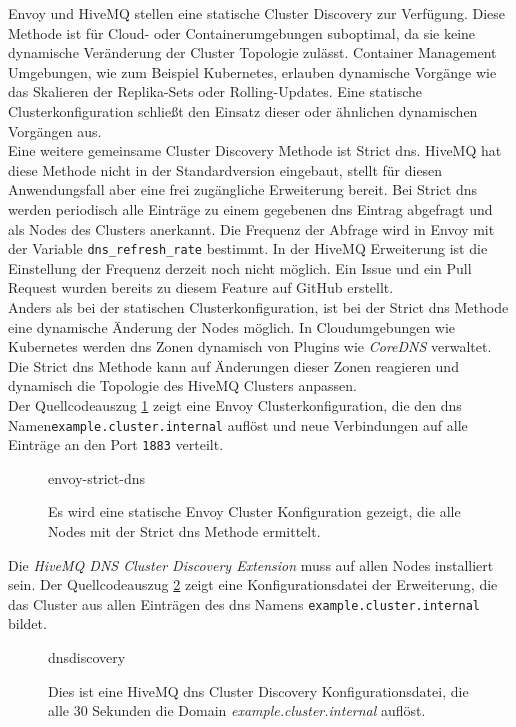 Envoy und HiveMQ stellen eine statische Cluster Discovery zur Verfügung. Diese Methode ist für Cloud- oder Containerumgebungen suboptimal, da sie keine dynamische Veränderung der Cluster Topologie zulässt. Container Management Umgebungen, wie zum Beispiel Kubernetes, erlauben dynamische Vorgänge wie das Skalieren der Replika-Sets oder Rolling-Updates. Eine statische Clusterkonfiguration schlie{\ss}t den Einsatz dieser oder ähnlichen dynamischen Vorgängen aus.\\
Eine weitere gemeinsame Cluster Discovery Methode ist Strict \ac{dns}. HiveMQ hat diese Methode nicht in der Standardversion eingebaut, stellt für diesen Anwendungsfall aber eine frei zugängliche Erweiterung bereit.
Bei Strict \ac{dns} werden periodisch alle Einträge zu einem gegebenen \ac{dns} Eintrag abgefragt und als Nodes des Clusters anerkannt. Die Frequenz der Abfrage wird in Envoy mit der Variable \verb|dns_refresh_rate| bestimmt. In der HiveMQ Erweiterung ist die Einstellung der Frequenz derzeit noch nicht möglich. Ein Issue \cite{AllowConfigurationDiscovery} und ein Pull Request \cite{ExponentialBackoffGeneral} wurden bereits zu diesem Feature auf GitHub erstellt.
\\
Anders als bei der statischen Clusterkonfiguration, ist bei der Strict \ac{dns} Methode eine dynamische Änderung der Nodes möglich. In Cloudumgebungen wie Kubernetes werden \ac{dns} Zonen dynamisch von Plugins wie \textit{CoreDNS} verwaltet.\cite{DNSServicesPods}
Die Strict \ac{dns} Methode kann auf Änderungen dieser Zonen reagieren und dynamisch die Topologie des HiveMQ Clusters anpassen.
\\
Der Quellcodeauszug \ref{code:envoy-strict-dns} zeigt eine Envoy Clusterkonfiguration, die den \ac{dns} Namen\newline \verb|example.cluster.internal| auflöst und neue Verbindungen auf alle Einträge an den Port \verb|1883| verteilt.
\begin{figure}
    {envoy-strict-dns}
    \caption{Es wird eine statische Envoy Cluster Konfiguration gezeigt, die alle Nodes mit der Strict \ac{dns} Methode ermittelt.}
    \label{code:envoy-strict-dns}
\end{figure}
Die \textit{HiveMQ DNS Cluster Discovery Extension} \cite{HiveMQExtensionDNS} muss auf allen Nodes installiert sein. Der Quellcodeauszug \ref{code:hivemq-dnsdiscovery} zeigt eine Konfigurationsdatei der Erweiterung, die das Cluster aus allen Einträgen des \ac{dns} Namens \verb|example.cluster.internal| bildet.
\begin{figure}
    {dnsdiscovery}
    \caption{Dies ist eine HiveMQ \ac{dns} Cluster Discovery Konfigurationsdatei, die alle 30 Sekunden die Domain \textit{example.cluster.internal} auflöst.}
    \label{code:hivemq-dnsdiscovery}
\end{figure}

